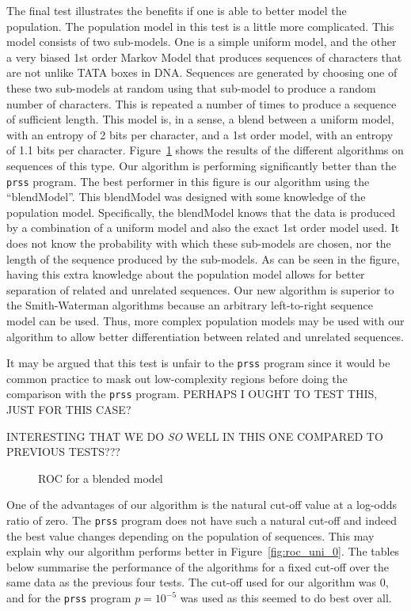 \documentclass[letterpaper,11pt,oneside]{article}
\def\plotwidth{0.7\columnwidth}
\begin{document}
The final test illustrates the benefits if one is able to better model the
population.  The population model in this test is a little more complicated.
This model consists of two sub-models.  One is a simple uniform model, and the
other a very biased 1st order Markov Model that produces sequences of
characters that are not unlike TATA boxes in DNA.  Sequences are generated by
choosing one of these two sub-models at random using that sub-model to produce
a random number of characters.  This is repeated a number of times to produce
a sequence of sufficient length.  This model is, in a sense, a blend between a
uniform model, with an entropy of 2 bits per character, and a 1st order model,
with an entropy of 1.1 bits per character.  Figure~\ref{fig:roc_blend} shows
the results of the different algorithms on sequences of this type.  Our
algorithm is performing significantly better than the \verb!prss! program.
The best performer in this figure is our algorithm using the ``blendModel''.
This blendModel was designed with some knowledge of the population model.
Specifically, the blendModel knows that the data is produced by a combination
of a uniform model and also the exact 1st order model used.  It does not know
the probability with which these sub-models are chosen, nor the length of the
sequence produced by the sub-models.  As can be seen in the figure, having
this extra knowledge about the population model allows for better separation
of related and unrelated sequences.  Our new algorithm is superior to the
Smith-Waterman algorithms because an arbitrary left-to-right sequence model
can be used.  Thus, more complex population models may be used with our
algorithm to allow better differentiation between related and unrelated
sequences.


It may be argued that this test is unfair to the \verb!prss! program since it
would be common practice to mask out low-complexity regions before doing the
comparison with the \verb!prss! program.  PERHAPS I OUGHT TO TEST THIS, JUST
FOR THIS CASE?

INTERESTING THAT WE DO \emph{SO} WELL IN THIS ONE COMPARED TO PREVIOUS TESTS???

\begin{figure}
\centering
\epsfig{file=roc_blend.eps, width=\plotwidth}
\caption{\label{fig:roc_blend}ROC for a blended model}
\end{figure}


One of the advantages of our algorithm is the natural cut-off value at a
log-odds ratio of zero.  The \verb!prss! program does not have such a natural
cut-off and indeed the best value changes depending on the population of
sequences.  This may explain why our algorithm performs better in
Figure~\ref{fig:roc_uni_0}.  The tables below summarise the performance of the
algorithms for a fixed cut-off over the same data as the previous four tests.
The cut-off used for our algorithm was 0, and for the \verb!prss! program
$p=10^{-5}$ was used as this seemed to do best over all.
\end{document}
